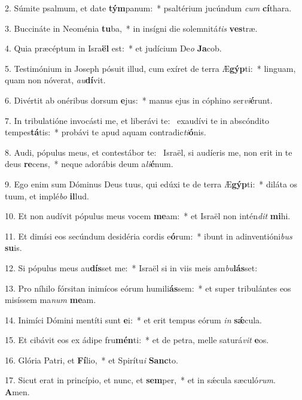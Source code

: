 2. Súmite psalmum, et date \textbf{tým}panum:~*  psaltérium jucúndum \textit{cum} \textbf{cí}thara.\

3. Buccináte in Neoménia \textbf{tu}ba,~*  in insígni die solemnitá\textit{tis} \textbf{ves}træ.\

4. Quia præcéptum in Isra\textbf{ël} est:~*  et judícium De\textit{o} \textbf{Ja}cob.\

5. Testimónium in Joseph pósuit illud, cum exíret de terra Æ\textbf{gýp}ti:~*  linguam, quam non nóverat, \textit{au}\textbf{dí}vit.\

6. Divértit ab onéribus dorsum \textbf{e}jus:~*  manus ejus in cóphino ser\textit{vi}\textbf{é}runt.\

7. In tribulatióne invocásti me, et liberávi te: \dag\  exaudívi te in abscóndito tempes\textbf{tá}tis:~*  probávi te apud aquam contradic\textit{ti}\textbf{ó}nis.\

8. Audi, pópulus meus, et contestábor te: \dag\  Israël, si audíeris me, non erit in te deus \textbf{re}cens,~*  neque adorábis deum a\textit{li}\textbf{é}num.\

9. Ego enim sum Dóminus Deus tuus, qui edúxi te de terra Æ\textbf{gýp}ti:~*  diláta os tuum, et implé\textit{bo} \textbf{il}lud.\

10. Et non audívit pópulus meus vocem \textbf{me}am:~*  et Israël non intén\textit{dit} \textbf{mi}hi.\

11. Et dimísi eos secúndum desidéria cordis e\textbf{ó}rum:~*  ibunt in adinventióni\textit{bus} \textbf{su}is.\

12. Si pópulus meus au\textbf{dís}set me:~*  Israël si in viis meis am\textit{bu}\textbf{lás}set:\

13. Pro níhilo fórsitan inimícos eórum humili\textbf{ás}sem:~*  et super tribulántes eos misíssem ma\textit{num} \textbf{me}am.\

14. Inimíci Dómini mentíti sunt \textbf{e}i:~*  et erit tempus eórum \textit{in} \textbf{sǽ}cula.\

15. Et cibávit eos ex ádipe fru\textbf{mén}ti:~*  et de petra, melle saturá\textit{vit} \textbf{e}os.\

16. Glória Patri, et \textbf{Fí}lio,~*  et Spirítu\textit{i} \textbf{Sanc}to.\

17. Sicut erat in princípio, et nunc, et \textbf{sem}per,~*  et in sǽcula sæculó\textit{rum}. \textbf{A}men.\

